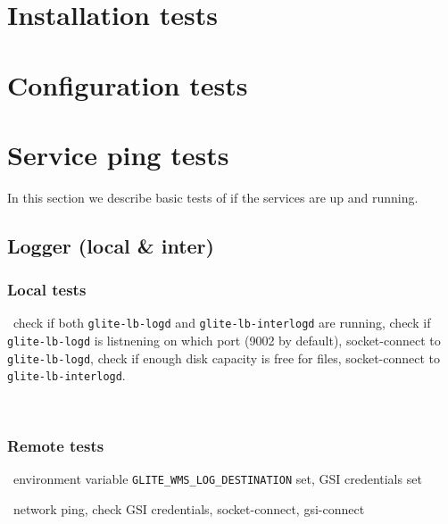 
\section{Installation tests}
\label{s:installation}


\newpage
\section{Configuration tests}
\label{s:configuration}


\newpage
\section{Service ping tests}
\label{s:ping}

In this section we describe basic tests of \LB if the services are up and running.

\subsection{Logger (local \& inter)}

\subsubsection{Local tests}
\what\ check if both \texttt{glite-lb-logd} and \texttt{glite-lb-interlogd} are running,
check if \texttt{glite-lb-logd} is listnening on which port (9002 by default),
socket-connect to \texttt{glite-lb-logd},
check if enough disk capacity is free for  files,
socket-connect to \texttt{glite-lb-interlogd}.

\how\ 


\subsubsection{Remote tests}
\req\ environment variable \texttt{GLITE\_WMS\_LOG\_DESTINATION} set, GSI credentials set

\what\ network ping,
check GSI credentials,
socket-connect,
gsi-connect

\how\ 


